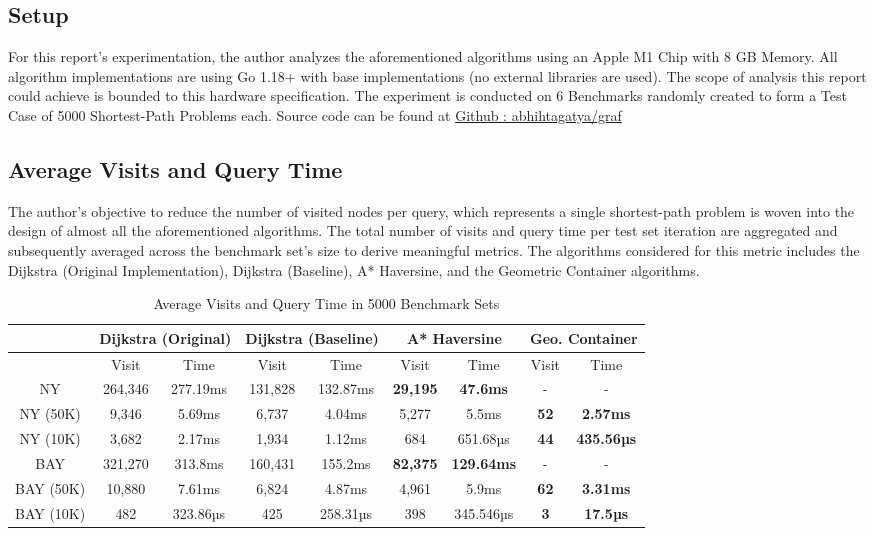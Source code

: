 \documentclass{article}
\begin{document}
\subsection{Setup}

For this report's experimentation, the author analyzes the aforementioned algorithms using an Apple M1 Chip with 8 GB Memory. All algorithm implementations are using Go 1.18+ with base implementations (no external libraries are used). The scope of analysis this report could achieve is bounded to this hardware specification. The experiment is conducted on 6 Benchmarks randomly created to form a Test Case of 5000 Shortest-Path Problems each. Source code can be found at \href{https://github.com/abhishtagatya/graf}{Github : abhihtagatya/graf}

\subsection{Average Visits and Query Time}

The author's objective to reduce the number of visited nodes per query, which represents a single shortest-path problem is woven into the design of almost all the aforementioned algorithms. The total number of visits and query time per test set iteration are aggregated and subsequently averaged across the benchmark set's size to derive meaningful metrics. The algorithms considered for this metric includes the Dijkstra (Original Implementation), Dijkstra (Baseline), A* Haversine, and the Geometric Container algorithms.

\begin{table}
    \centering
    \begin{tabular}{ccccccccc}
 & \multicolumn{2}{c}{Dijkstra (Original)}& \multicolumn{2}{c}{Dijkstra (Baseline)}& \multicolumn{2}{c}{A* Haversine}& \multicolumn{2}{c}{Geo. Container}\\
 \hline
         &  Visit&  Time&  Visit&  Time&  Visit&  Time&  Visit& Time\\
         \hline
         NY&  264,346&  277.19ms&  131,828&  132.87ms&  \textbf{29,195}&  \textbf{47.6ms} &  -& -\\
         NY (50K)&  9,346&  5.69ms&  6,737 &  4.04ms&  5,277&  5.5ms&  \textbf{52}& \textbf{2.57ms}\\
         NY (10K)&  3,682&  2.17ms&  1,934&  1.12ms&  684&  651.68µs&  \textbf{44}& \textbf{435.56µs}\\
         \hline
         BAY&  321,270&  313.8ms&  160,431&  155.2ms&  \textbf{82,375}&  \textbf{129.64ms}&  -& -\\
         BAY (50K)&  10,880&  7.61ms&  6,824&  4.87ms&  4,961&  5.9ms&  \textbf{62}& \textbf{3.31ms}\\
         BAY (10K)&  482&  323.86µs&  425&  258.31µs&  398&  345.546µs&  \textbf{3}& \textbf{17.5µs}\\
         \hline
    \end{tabular}
    \caption{Average Visits and Query Time in 5000 Benchmark Sets}
    \label{tab:avgvq}
\end{table}
\end{document}
